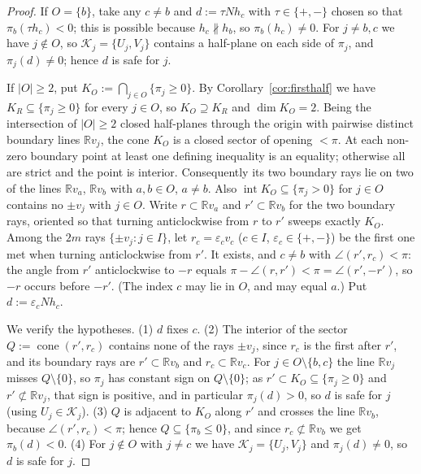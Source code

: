 \documentclass[11pt,reqno]{amsart}
\theoremstyle{plain}
\theoremstyle{definition}
\theoremstyle{remark}
\theoremstyle{plain}
\theoremstyle{remark}
\theoremstyle{definition}
\numberwithin{equation}{section}
\newcommand{\R}{\mathbb{R}}
\newcommand{\cK}{\mathcal{K}}
\begin{document}
\begin{proof}
If $O=\{b\}$, take any $c\ne b$ and $d:=\tau Nh_c$ with $\tau\in\{+,-\}$ chosen
so that $\pi_b(\tau h_c)<0$; this is possible because $h_c\nparallel h_b$, so
$\pi_b(h_c)\ne0$.  For $j\ne b,c$ we have $j\notin O$, so
$\cK_j=\{U_j,V_j\}$ contains a half-plane on each side of $\pi_j$, and
$\pi_j(d)\ne0$; hence $d$ is safe for $j$.

If $|O|\ge2$, put $K_O:=\bigcap_{j\in O}\{\pi_j\ge0\}$.  By
Corollary~\ref{cor:firsthalf} we have $K_R\subseteq\{\pi_j\ge0\}$ for every
$j\in O$, so $K_O\supseteq K_R$ and $\dim K_O=2$.  Being the
intersection of $|O|\ge2$ closed half-planes through the origin with pairwise
distinct boundary lines $\R v_j$, the cone $K_O$ is a closed sector of opening
$<\pi$.  At each non-zero boundary point at least one defining inequality
is an equality; otherwise all are strict and the point is interior.
Consequently its two boundary rays lie on two of the lines $\R v_a$, $\R v_b$
with $a,b\in O$, $a\ne b$.  Also $\operatorname{int}K_O\subseteq\{\pi_j>0\}$ for
$j\in O$ contains no $\pm v_j$ with $j\in O$.  Write $r\subset\R v_a$ and
$r'\subset\R v_b$ for the two boundary rays, oriented so that turning
anticlockwise from $r$ to $r'$ sweeps exactly $K_O$.  Among the $2m$ rays
$\{\pm v_j:j\in I\}$, let $r_c=\varepsilon_cv_c$ ($c\in I$,
$\varepsilon_c\in\{+,-\}$) be the first one met when turning anticlockwise from
$r'$.  It exists, and $c\ne b$ with $\angle(r',r_c)<\pi$: the angle from $r'$
anticlockwise to $-r$ equals $\pi-\angle(r,r')<\pi=\angle(r',-r')$, so $-r$
occurs before $-r'$.  (The index $c$ may lie in $O$, and may equal $a$.)  Put
$d:=\varepsilon_cNh_c$.

We verify the hypotheses.  \textup{(1)} $d$ fixes $c$.  \textup{(2)} The
interior of the sector $Q:=\operatorname{cone}(r',r_c)$ contains none of the
rays $\pm v_j$, since $r_c$ is the first after $r'$, and its boundary rays are
$r'\subset\R v_b$ and $r_c\subset\R v_c$.  For $j\in O\setminus\{b,c\}$ the line
$\R v_j$ misses $Q\setminus\{0\}$, so $\pi_j$ has constant sign on
$Q\setminus\{0\}$; as $r'\subset K_O\subseteq\{\pi_j\ge0\}$ and
$r'\not\subset\R v_j$, that sign is positive, and in particular $\pi_j(d)>0$, so
$d$ is safe for $j$ (using $U_j\in\cK_j$).  \textup{(3)} $Q$ is adjacent to
$K_O$ along $r'$ and crosses the line $\R v_b$, because
$\angle(r',r_c)<\pi$; hence $Q\subseteq\{\pi_b\le0\}$, and since
$r_c\not\subset\R v_b$ we get $\pi_b(d)<0$.  \textup{(4)} For $j\notin O$ with
$j\ne c$ we have $\cK_j=\{U_j,V_j\}$ and $\pi_j(d)\ne0$, so $d$ is safe for $j$.
\end{proof}
\end{document}
